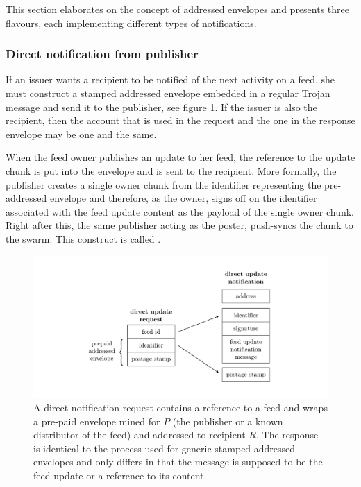 This section elaborates on the concept of addressed envelopes and presents three flavours, each implementing different types of notifications.

\subsubsection{Direct notification from publisher}

If an issuer wants a recipient to be notified of the next activity on a feed, she must construct a stamped addressed envelope embedded in a regular Trojan message and send it to the publisher, see figure \ref{fig:direct-notification}. If the issuer is also the recipient, then the account that is used in the request and the one in the response envelope may be one and the same. 


When the feed owner publishes an update to her feed, the reference to the update chunk is put into the envelope and is sent to the recipient. More formally, the publisher creates a single owner chunk from the identifier representing the pre-addressed envelope and therefore, as the owner, signs off on the identifier associated with the feed update content as the payload of the single owner chunk. Right after this, the same publisher acting as the poster, push-syncs the chunk to the swarm. This construct is called . 

\begin{figure}[htbp]
   \centering
   \includegraphics[width=\textwidth]{fig/direct-notification.pdf}
   \caption[Direct notification request and response \statusgreen]{A direct notification request contains a reference to a feed and wraps a pre-paid envelope mined for $P$ (the publisher or a known distributor of the feed) and addressed to recipient $R$. The response is identical to the process used for generic stamped addressed envelopes and only differs in that the message is supposed to be the feed update or a reference to its content.}
   \label{fig:direct-notification}
\end{figure}

